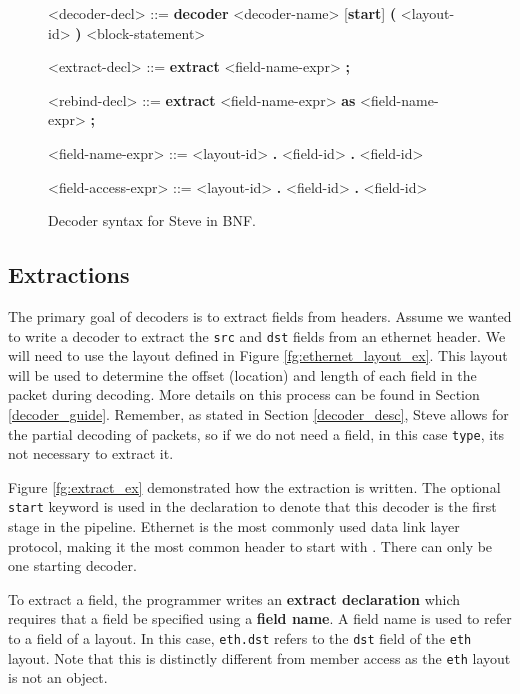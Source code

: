 \begin{figure}
\begin{mdframed}
\begin{grammar}

<decoder-decl> ::=
\textbf{decoder} <decoder-name> [\textbf{start}] 
\textbf{(} <layout-id> \textbf{)}
<block-statement>

<extract-decl> ::=
\textbf{extract} <field-name-expr> \textbf{;}

<rebind-decl> ::=
\textbf{extract} <field-name-expr> \textbf{as} <field-name-expr> \textbf{;}

<field-name-expr> ::=
<layout-id> \textbf{.} <field-id>
 \textbf{.} <field-id>

<field-access-expr> ::=
<layout-id> \textbf{.} <field-id>
 \textbf{.} <field-id>

\end{grammar}
\end{mdframed}
\caption{Decoder syntax for Steve in BNF.}
\label{fg:decoder_syntax}
\end{figure}

\subsection{Extractions} \label{decoder_extract_tut}

The primary goal of decoders is to extract fields from headers. Assume we wanted to write a decoder to extract the \texttt{src} and \texttt{dst} fields from an ethernet header. We will need to use the layout defined in Figure \ref{fg:ethernet_layout_ex}. This layout will be used to determine the offset (location) and length of each field in the packet during decoding. More details on this process can be found in Section \ref{decoder_guide}. Remember, as stated in Section \ref{decoder_desc}, Steve allows for the partial decoding of packets, so if we do not need a field, in this case \texttt{type}, its not necessary to extract it.

Figure \ref{fg:extract_ex} demonstrated how the extraction is written. The optional \texttt{start} keyword is used in the declaration to denote that this decoder is the first stage in the pipeline. Ethernet is the most commonly used data link layer protocol, making it the most common header to start with \cite{something}. There can only be one starting decoder. 

To extract a field, the programmer writes an \textbf{extract declaration} which requires that a field be specified using a \textbf{field name}. A field name is used to refer to a field of a layout. In this case, \texttt{eth.dst} refers to the \texttt{dst} field of the \texttt{eth} layout.  Note that this is distinctly different from member access as the \texttt{eth} layout is not an object. 

